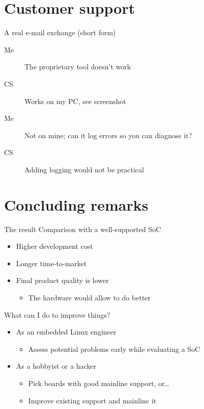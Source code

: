 \documentclass[xetex,table,aspectratio=169]{beamer}
\begin{document}
\section{Customer support}

\begin{frame}{A real e-mail exchange (short form)}
  \begin{description}
  \item[Me] The proprietary tool doesn't work
  \item[CS] Works on my PC, see screenshot
  \item[Me] Not on mine; can it log errors so you can diagnose it?
  \item[CS] Adding logging would not be practical
  \end{description}
\end{frame}

\section{Concluding remarks}

\begin{frame}{The result}
  Comparison with a well-supported SoC
  \begin{itemize}
  \item Higher development cost
  \item Longer time-to-market
  \item Final product quality is lower
    \begin{itemize}
    \item The hardware would allow to do better
    \end{itemize}
  \end{itemize}
\end{frame}

\begin{frame}{What can I do to improve things?}
  \begin{itemize}
  \item As an embedded Linux engineer
    \begin{itemize}
    \item Assess potential problems early while evaluating a SoC
    \end{itemize}
  \item As a hobbyist or a hacker
    \begin{itemize}
    \item Pick boards with good mainline support, or\dots
    \item Improve existing support and mainline it
    \end{itemize}
  \end{itemize}
\end{frame}
\end{document}
